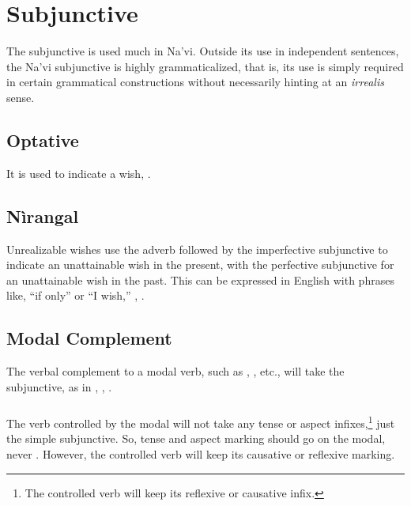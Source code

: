 \section{Subjunctive}
\noindent The subjunctive is used much in Na'vi.  Outside its use in
independent sentences, the Na'vi subjunctive is highly
grammaticalized, that is, its use is simply required in certain
grammatical constructions without necessarily hinting at an
\textit{irrealis} sense.

\subsection{Optative} It is used to indicate a wish,  .

\subsection{Nìrangal} Unrealizable wishes use the adverb 
followed by the imperfective subjunctive to indicate an unattainable
wish in the present, with the perfective subjunctive for an
unattainable wish in the past.  This can be expressed in English with
phrases like, ``if only'' or ``I wish,''  ,
 .

\subsection{Modal Complement} 
The verbal complement to a modal verb, such as  ,
 , etc., will take the subjunctive, as in  ,  ,  . \label{syn:modals}


\subsubsection{} \label{syn:modal-syntax} The verb controlled by the
modal will not take any tense or aspect infixes,\footnote{The
controlled verb will keep its reflexive or causative infix.} just the
simple subjunctive.  So, tense and aspect marking should go on the
modal,   never .  However, the controlled verb will keep its causative or
reflexive marking. 


